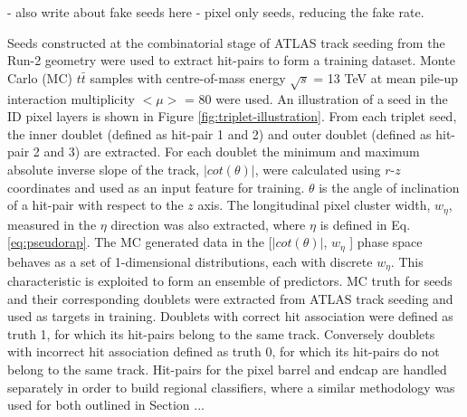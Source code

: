 
- also write about fake seeds here
  - pixel only seeds, reducing the fake rate. 

Seeds constructed at the combinatorial stage of ATLAS track seeding from the Run-2 geometry were used to extract hit-pairs to form a training dataset. Monte Carlo (MC) $t\bar{t}$ samples with centre-of-mass energy $\sqrt{s}$ = 13 TeV at mean pile-up interaction multiplicity $< \mu >$ = 80 were used. An illustration of a seed in the ID pixel layers is shown in Figure \ref{fig:triplet-illustration}. From each triplet seed, the inner doublet (defined as hit-pair 1 and 2) and outer doublet (defined as hit-pair 2 and 3) are extracted. For each doublet the minimum and maximum absolute inverse slope of the track, $|cot(\theta)|$, were calculated using $r$-$z$ coordinates and used as an input feature for training. $\theta$ is the angle of inclination of a hit-pair with respect to the $z$ axis. The longitudinal pixel cluster width, $w_{\eta}$, measured in the $\eta$ direction was also extracted, where $\eta$ is defined in Eq. \ref{eq:pseudorap}. The MC generated data in the [$|cot(\theta)|$, $w_{\eta}$ ] phase space behaves as a set of 1-dimensional distributions, each with discrete $w_{\eta}$. This characteristic is exploited to form an ensemble of predictors. MC truth for seeds and their corresponding doublets were extracted from ATLAS track seeding and used as targets in training. Doublets with correct hit association were defined as truth 1, for which its hit-pairs belong to the same track. Conversely doublets with incorrect hit association defined as truth 0, for which its hit-pairs do not belong to the same track. Hit-pairs for the pixel barrel and endcap are handled separately in order to build regional classifiers, where a similar methodology was used for both outlined in Section ...



